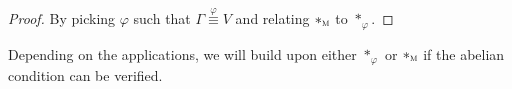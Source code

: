 \begin{proof} By picking $\varphi$ such that $\Gamma \overset{\varphi}{\equiv} V$ and relating $\ast_{\operatorname{\textsc{m}}}$ to $\ast_{\varphi}$.
\end{proof}

Depending on the applications, we will build upon either $\ast_{\varphi}$ or $\ast_{\operatorname{\textsc{m}}}$ if the abelian condition can be verified.




